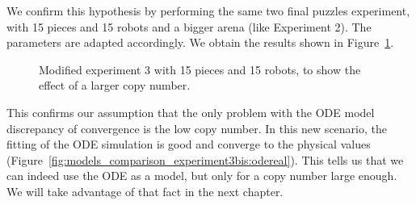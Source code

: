 		We confirm this hypothesis by performing the same two final puzzles experiment, with 15 pieces and 15 robots and a bigger arena (like Experiment 2). The parameters are adapted accordingly. We obtain the results shown in Figure~\ref{fig:models_comparison_experiment3bis}.
		
		\begin{figure}[h!]
			\: %
			\caption{Modified experiment 3 with 15 pieces and 15 robots, to show the effect of a larger copy number.}
		\label{fig:models_comparison_experiment3bis} %
		\end{figure}
		
		This confirms our assumption that the only problem with the ODE model discrepancy of convergence is the low copy number. In this new scenario, the fitting of the ODE simulation is good and converge to the physical values (Figure~\ref{fig:models_comparison_experiment3bis:odereal}). This tells us that we can indeed use the ODE as a model, but only for a copy number large enough. We will take advantage of that fact in the next chapter.
		
